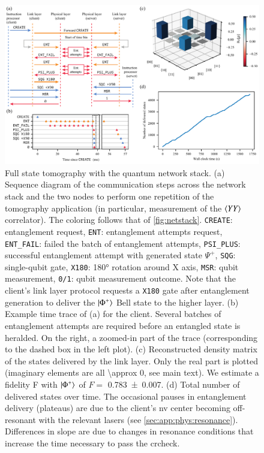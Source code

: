 \begin{figure}[t]
    \centering
    \includegraphics[width=\linewidth]{figures/fstomography.pdf}
    \caption{
        Full state tomography with the quantum network stack.
        (a) Sequence diagram of the communication steps across the network stack and the two nodes
        to perform one repetition of the tomography application (in particular, measurement of the
        $\braket{YY}$ correlator). The coloring follows that of \cref{fig:netstack}.
        \texttt{CREATE}: entanglement request, \texttt{ENT}: entanglement attempts request,
        \texttt{ENT\_FAIL}: failed the batch of entanglement attempts, \texttt{PSI\_PLUS}:
        successful entanglement attempt with generated state $\Psi^+$, \texttt{SQG}: single-qubit
        gate, \texttt{X180}: \ang{180} rotation around X axis, \texttt{MSR}: qubit measurement,
        \texttt{0/1}: qubit measurement outcome. Note that the client's link layer protocol requests
        a \texttt{X180} gate after entanglement generation to deliver the $\ket{\Phi^+}$ Bell state
        to the higher layer.
        (b) Example time trace of (a) for the client. Several batches of entanglement attempts are
        required before an entangled state is heralded. On the right, a zoomed-in part of the trace
        (corresponding to the dashed box in the left plot).
        (c) Reconstructed density matrix of the states delivered by the link layer. Only the real
        part is plotted (imaginary elements are all \num{\approx 0}, see main text). We estimate a
        fidelity F with $\ket{\Phi^+}$ of $F =$ \num{0.783(7)}.
        (d) Total number of delivered states over time. The occasional pauses in entanglement
        delivery (plateaus) are due to the client's \acrshort{nv} center becoming off-resonant with
        the relevant lasers (see \cref{sec:app:phys:resonance}). Differences in slope are due to
        changes in resonance conditions that increase the time necessary to pass the
        \acrlong{crcheck}.
    }
    \label{fig:fstomography}
\end{figure}

